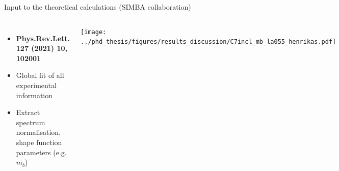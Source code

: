 \documentclass[xcolor=dvipsnames]{beamer}
\begin{document}
\begin{frame}{Input to the theoretical calculations (SIMBA collaboration)}
\begin{columns}
   \centering
   \begin{itemize}
      \item[]          {\tiny\textbf{Phys.Rev.Lett. 127 (2021) 10, 102001}}
      \item Global fit of all experimental information
      \item Extract spectrum normalisation, shape function parameters (e.g. $m_b$)
   \end{itemize}
   \texttt{[image: ../phd\_thesis/figures/results\_discussion/C7incl\_mb\_la055\_henrikas.pdf]}

\end{columns}


\end{frame}   
\end{document}
